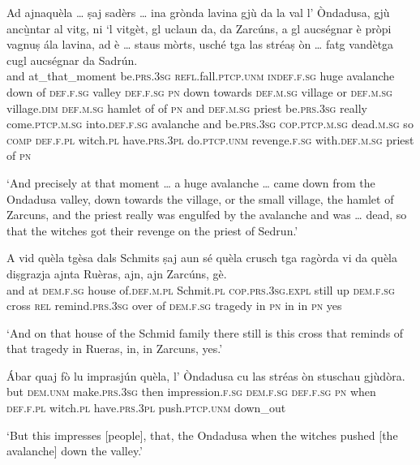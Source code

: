 \begin{linenumbers}
\gll    Ad ajnaquèla … ṣaj sadèrs … ina grònda lavina gjù da la val l' Òndadusa, gjù ancù̱ntar al vitg, ni `l vitgèt, gl uclaun da, da Zarcúns, a gl aucségnar è pròpi vagnuṣ ála lavina, ad è … staus mòrts, usché tga las stréaṣ òn … fatg vandètga cugl aucségnar da Sadrún.\\
and at\_that\_moment {} be.\textsc{prs.3sg} \textsc{refl.}fall.\textsc{ptcp.unm} {} \textsc{indef.f.sg} huge avalanche down of \textsc{def.f.sg} valley \textsc{def.f.sg} \textsc{pn} down towards \textsc{def.m.sg} village or \textsc{def.m.sg} village.\textsc{dim} \textsc{def.m.sg} hamlet of of \textsc{pn} and \textsc{def.m.sg} priest be.\textsc{prs.3sg} really come.\textsc{ptcp.m.sg} into.\textsc{def.f.sg} avalanche and be.\textsc{prs.3sg} {} \textsc{cop.ptcp.m.sg} dead.\textsc{m.sg} so \textsc{comp} \textsc{def.f.pl} witch.\textsc{pl} have.\textsc{prs.3pl} {} do.\textsc{ptcp.unm} revenge.\textsc{f.sg} with.\textsc{def.m.sg} priest of \textsc{pn}\\
\end{linenumbers}
\medskip
\glt `And precisely at that moment … a huge avalanche … came down from the Ondadusa valley, down towards the village, or the small village, the hamlet of Zarcuns, and the priest really was engulfed by the avalanche and was … dead, so that the witches got their revenge on the priest of Sedrun.'
\medskip

\begin{linenumbers}
\gll    A vid quèla tgèsa dals Schmits ṣaj aun sé quèla crusch tga ragòrda vi da quèla diṣgrazja ajnta Ruèras, ajn, ajn Zarcúns, gè.\\
and at \textsc{dem.f.sg} house of.\textsc{def.m.pl} Schmit.\textsc{pl} \textsc{cop.prs.3sg.expl} still up \textsc{dem.f.sg} cross \textsc{rel} remind.\textsc{prs.3sg} over of \textsc{dem.f.sg} tragedy in \textsc{pn} in in \textsc{pn} yes\\
\end{linenumbers}
\medskip
\glt `And on that house of the Schmid family there still is this cross that reminds of that tragedy in Rueras, in, in Zarcuns, yes.'
\medskip

\begin{linenumbers}
\gll    Ábar quaj fò lu imprasjún quèla, l' Òndadusa cu las stréas òn stuschau gjùdòra.\\
but \textsc{dem.unm} make.\textsc{prs.3sg} then impression.\textsc{f.sg} \textsc{dem.f.sg} \textsc{def.f.sg} \textsc{pn} when \textsc{def.f.pl} witch.\textsc{pl}  have.\textsc{prs.3pl} push.\textsc{ptcp.unm} down\_out\\
\end{linenumbers}
\medskip
\glt `But this impresses [people], that, the Ondadusa when the witches pushed [the avalanche] down the valley.'
\medskip

